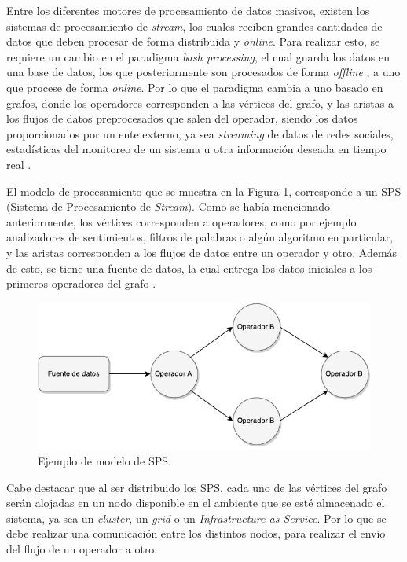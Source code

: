 Entre los diferentes motores de procesamiento de datos masivos, existen los sistemas de procesamiento de \textsl{stream}, los cuales reciben grandes cantidades de datos que deben procesar de forma distribuida y \textsl{online}. Para realizar esto, se requiere un cambio en el paradigma \textsl{bash processing}, el cual guarda los datos en una base de datos, los que posteriormente son procesados de forma \textsl{offline} \citep{HawwashN14}, a uno que procese de forma \textsl{online}. Por lo que el paradigma cambia a uno basado en grafos, donde los operadores corresponden a las vértices del grafo, y las aristas a los flujos de datos preprocesados que salen del operador, siendo los datos proporcionados por un ente externo, ya sea \textit{streaming} de datos de redes sociales, estadísticas del monitoreo de un sistema u otra información deseada en tiempo real \citep{Shahrivari14}.

El modelo de procesamiento que se muestra en la Figura \ref{fig:grafo}, corresponde a un SPS (Sistema de Procesamiento de \textit{Stream}). Como se había mencionado anteriormente, los vértices corresponden a operadores, como por ejemplo analizadores de sentimientos, filtros de palabras o algún algoritmo en particular, y las aristas corresponden a los flujos de datos entre un operador y otro. Además de esto, se tiene una fuente de datos, la cual entrega los datos iniciales a los primeros operadores del grafo \citep{AppelFFB12}.

\begin{figure}[ht!]
  \centering
    \includegraphics[scale=1]{images/SPS.pdf}
  \caption{Ejemplo de modelo de SPS.}
  \label{fig:grafo}
\end{figure}

Cabe destacar que al ser distribuido los SPS, cada uno de las vértices del grafo serán alojadas en un nodo disponible en el ambiente que se esté almacenado el sistema, ya sea un \textit{cluster}, un \textit{grid} o un \textit{Infrastructure-as-Service}. Por lo que se debe realizar una comunicación entre los distintos nodos, para realizar el envío del flujo de un operador a otro.


